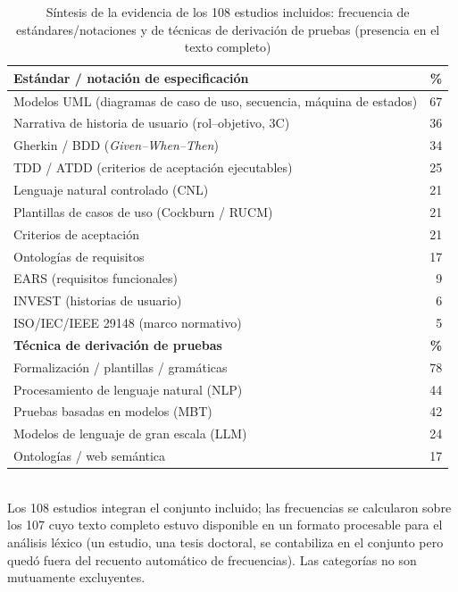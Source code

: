 \documentclass[10pt,journal,twoside,letterpaper]{IEEEtran}
\begin{document}
	\begin{table}[!tb]
		\caption{Síntesis de la evidencia de los 108 estudios incluidos: frecuencia de estándares/notaciones y de técnicas de derivación de pruebas (presencia en el texto completo)}
		\label{tab:sintesis}
		\centering
		\small
		\setlength{\tabcolsep}{6pt}
		\begin{tabular}{@{}p{6.9cm}r@{}}
			\toprule
			\textbf{Estándar / notación de especificación} & \textbf{\%} \\
			\midrule
			Modelos UML (diagramas de caso de uso, secuencia, máquina de estados) & 67 \\
			Narrativa de historia de usuario (rol--objetivo, 3C) & 36 \\
			Gherkin / BDD (\emph{Given--When--Then}) & 34 \\
			TDD / ATDD (criterios de aceptación ejecutables) & 25 \\
			Lenguaje natural controlado (CNL) & 21 \\
			Plantillas de casos de uso (Cockburn / RUCM) & 21 \\
			Criterios de aceptación & 21 \\
			Ontologías de requisitos & 17 \\
			EARS (requisitos funcionales) & 9 \\
			INVEST (historias de usuario) & 6 \\
			ISO/IEC/IEEE 29148 (marco normativo) & 5 \\
			\midrule
			\textbf{Técnica de derivación de pruebas} & \textbf{\%} \\
			\midrule
			Formalización / plantillas / gramáticas & 78 \\
			Procesamiento de lenguaje natural (NLP) & 44 \\
			Pruebas basadas en modelos (MBT) & 42 \\
			Modelos de lenguaje de gran escala (LLM) & 24 \\
			Ontologías / web semántica & 17 \\
			\bottomrule
		\end{tabular}
		\\[3pt]
		{\footnotesize Los 108 estudios integran el conjunto incluido; las frecuencias se calcularon sobre los 107 cuyo texto completo estuvo disponible en un formato procesable para el análisis léxico (un estudio, una tesis doctoral, se contabiliza en el conjunto pero quedó fuera del recuento automático de frecuencias). Las categorías no son mutuamente excluyentes.}
	\end{table}
\end{document}
